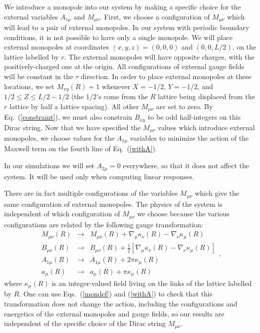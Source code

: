 We introduce a monopole into our system by making a specific choice for the external variables $A_{1\mu}$ and $M_{\mu\nu}$. First, we choose a configuration of $M_{\mu\nu}$ which will lead to a pair of external monopoles. In our system with periodic boundary conditions, it is not possible to have only a single monopole. We will place external monopoles at coordinates $(x,y,z)=(0,0,0)$ and $(0,0,L/2)$, on the lattice labelled by $r$. The external monopoles will have opposite charges, with the positively-charged one at the origin. All configurations of external gauge fields will be constant in the $\tau$ direction. In order to place external monopoles at these locations, we set $M_{xy}(R)=1$ whenever $X=-1/2$, $Y=-1/2$, and $1/2 \leq Z \leq L/2-1/2$ (the $1/2$'s come from the $R$ lattice being displaced from the $r$ lattice by half a lattice spacing). All other $M_{\mu\nu}$ are set to zero. By Eq.~(\ref{constraint}), we must also constrain $B_{xy}$ to be odd half-integers on this Dirac string. Now that we have specified the $M_{\mu\nu}$ values which introduce external monopoles, we choose values for the $A_{1\mu}$ variables to minimize the action of the Maxwell term on the fourth line of Eq.~(\ref{withA}). 

In our simulations we will set $A_{2\mu}=0$ everywhere, so that it does not affect the system. It will be used only when computing linear responses. 

There are in fact multiple configurations of the variables $M_{\mu\nu}$ which give the same configuration of external monopoles. The physics of the system is independent of which configuration of $M_{\mu\nu}$ we choose because the various configurations are related by the following gauge transformation:
\begin{equation}
\begin{array}{ccc}
M_{\mu\nu}(R)&\rightarrow&M_{\mu\nu}(R)+\nabla_\mu \kappa_\nu(R)-\nabla_\nu \kappa_\mu(R) \\
B_{\mu\nu}(R)&\rightarrow&B_{\mu\nu}(R)+\frac{1}{2}[\nabla_\mu \kappa_\nu(R)-\nabla_\nu \kappa_\mu(R)] \\
A_{1\mu}(R)&\rightarrow&A_{1\mu}(R)+2\pi \kappa_\mu(R)\\
a_\mu(R)&\rightarrow&a_\mu(R)+\pi \kappa_\mu(R)
\end{array},
\end{equation}
where $\kappa_\mu(R)$ is an integer-valued field living on the links of the lattice labelled by $R$. One can use Eqs.~(\ref{mondef}) and (\ref{withA}) to check that this transformation does not change the action, 
including the configurations and energetics of the external monopoles and gauge fields, so our results are independent of the specific choice of the Dirac string $M_{\mu\nu}$. 

